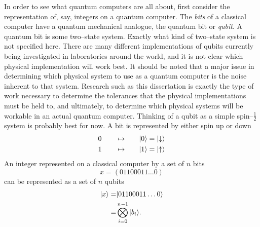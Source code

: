 In order to see what quantum computers are all about, first consider 
the representation of, say, integers on a quantum computer.
The {\sl bits} of a classical computer have a quantum mechanical analogue,
the quantum bit or \emph{qubit}.
A quantum bit is some two--state system.
Exactly what kind
of two--state system is not specified here.  There are many
different implementations of qubits currently being investigated
in laboratories
around the world, and it is not clear which physical implementation
will work best.  
It should be noted that a major issue in determining which physical system 
to use as a quantum computer is the noise inherent to that system.  
Research such as this dissertation is exactly the type of work necessary 
to determine the tolerances that the physical implementations must be held 
to, and ultimately, to determine which physical systems will be workable 
in an actual quantum computer.
Thinking of a qubit as a simple spin--$\frac{1}{2}$ system
is probably best for now.
A bit is represented by either spin up or down
\begin{equation}
\begin{split}
0\qquad\mapsto\qquad&{|{0}\rangle}={|{\downarrow}\rangle}\\
1\qquad\mapsto\qquad&{|{1}\rangle}={|{\uparrow}\rangle}\\
\end{split}
\end{equation}
An integer represented on a classical computer by a set of $n$ bits
\begin{equation}
x = (01100011\ldots0)
\end{equation}
can be represented as a set of $n$ qubits
\begin{equation}
\begin{split}
{|{x}\rangle} =& {|{01100011\ldots0}\rangle}\\
  =& \bigotimes_{i=0}^{n-1} {|{b_i}\rangle}.
\end{split}
\end{equation}

